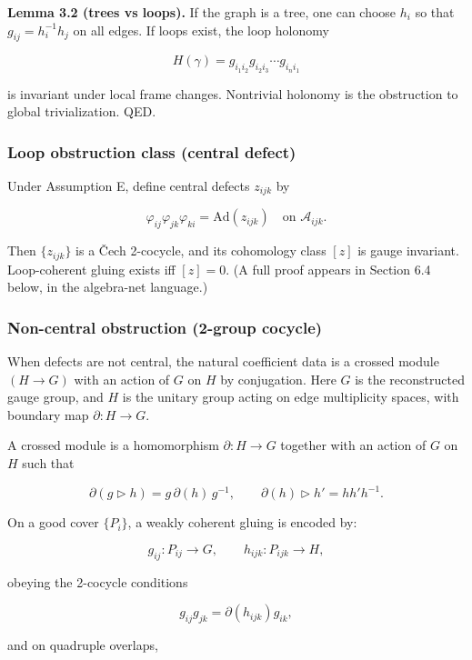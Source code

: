 \documentclass[11pt,a4paper]{article}
\theoremstyle{remark}
\begin{document}
\textbf{Lemma 3.2 (trees vs loops).} If the graph is a tree, one can choose \(h_i\) so
that \(g_{ij} = h_i^{-1} h_j\) on all edges. If loops exist, the loop holonomy

\[
H(\gamma) = g_{i_1 i_2} g_{i_2 i_3} \cdots g_{i_n i_1}
\]

is invariant under local frame changes. Nontrivial holonomy is the
obstruction to global trivialization. QED.

\subsubsection{Loop obstruction class (central defect)}\label{loop-obstruction-class-central-defect}

Under Assumption E, define central defects \(z_{ijk}\) by

\[
\varphi_{ij} \varphi_{jk} \varphi_{ki} = \mathrm{Ad}(z_{ijk}) \quad \text{on } \mathcal{A}_{ijk}.
\]

Then \(\{z_{ijk}\}\) is a \v{C}ech 2-cocycle, and its cohomology class \([z]\) is gauge
invariant. Loop-coherent gluing exists iff \([z] = 0\). (A full proof appears in
Section 6.4 below, in the algebra-net language.)

\subsubsection{Non-central obstruction (2-group cocycle)}\label{non-central-obstruction-2-group-cocycle}

When defects are not central, the natural coefficient data is a crossed module
\((H \to G)\) with an action of \(G\) on \(H\) by conjugation. Here \(G\) is the reconstructed
gauge group, and \(H\) is the unitary group acting on edge multiplicity spaces,
with boundary map \(\partial: H \to G\).

A crossed module is a homomorphism \(\partial: H \to G\) together with an action
of \(G\) on \(H\) such that

\[
\partial(g \triangleright h) = g\,\partial(h)\,g^{-1},
\qquad
\partial(h) \triangleright h' = h h' h^{-1}.
\]

On a good cover \(\{P_i\}\), a weakly coherent gluing is encoded by:

\[
g_{ij}: P_{ij} \to G,\qquad h_{ijk}: P_{ijk} \to H,
\]

obeying the 2-cocycle conditions

\[
g_{ij} g_{jk} = \partial(h_{ijk}) g_{ik},
\]

and on quadruple overlaps,
\end{document}
